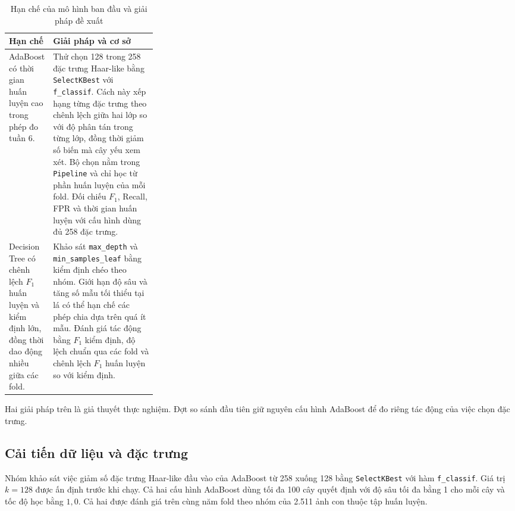 \documentclass[12pt,a4paper,oneside]{report}
\begin{document}
\begin{table}[htbp]
    \centering
    \small
    \caption{Hạn chế của mô hình ban đầu và giải pháp đề xuất}
    \label{tab:week8_limitations_solutions}
    \begin{tabularx}{\linewidth}{
        @{}>{\raggedright\arraybackslash}p{0.29\linewidth}
        >{\raggedright\arraybackslash}X@{}
    }
        \toprule
        \textbf{Hạn chế} & \textbf{Giải pháp và cơ sở} \\
        \midrule
        AdaBoost có thời gian huấn luyện cao trong phép đo tuần 6.
        &
        Thử chọn 128 trong 258 đặc trưng Haar-like bằng
        \texttt{SelectKBest} với \texttt{f\_classif}. Cách này xếp hạng
        từng đặc trưng theo chênh lệch giữa hai lớp so với độ phân tán
        trong từng lớp, đồng thời giảm số biến mà cây yếu xem xét.
        Bộ chọn nằm trong \texttt{Pipeline} và chỉ học từ phần huấn luyện
        của mỗi fold. Đối chiếu $F_1$, Recall, FPR và thời gian huấn luyện
        với cấu hình dùng đủ 258 đặc trưng.
        \\
        \addlinespace
        Decision Tree có chênh lệch $F_1$ huấn luyện và kiểm định
        lớn, đồng thời dao động nhiều giữa các fold.
        &
        Khảo sát \texttt{max\_depth} và \texttt{min\_samples\_leaf}
        bằng kiểm định chéo theo nhóm. Giới hạn độ sâu và tăng số mẫu
        tối thiểu tại lá có thể hạn chế các phép chia dựa trên quá ít
        mẫu. Đánh giá tác động bằng $F_1$ kiểm định, độ lệch chuẩn qua
        các fold và chênh lệch $F_1$ huấn luyện so với kiểm định.
        \\
        \bottomrule
    \end{tabularx}
\end{table}

Hai giải pháp trên là giả thuyết thực nghiệm. Đợt so sánh đầu tiên
giữ nguyên cấu hình AdaBoost để đo riêng tác động của việc chọn
đặc trưng.

\subsection{Cải tiến dữ liệu và đặc trưng}
\label{subsec:week8_selectkbest}

Nhóm khảo sát việc giảm số đặc trưng Haar-like đầu vào của AdaBoost
từ 258 xuống 128 bằng \texttt{SelectKBest} với hàm \texttt{f\_classif}.
Giá trị $k=128$ được ấn định trước khi chạy. Cả hai cấu hình AdaBoost
dùng tối đa 100 cây quyết định với độ sâu tối đa bằng 1 cho mỗi cây
và tốc độ học bằng $1{,}0$. Cả hai được đánh giá trên cùng năm fold
theo nhóm của 2.511 ảnh con thuộc tập huấn luyện.
\end{document}
